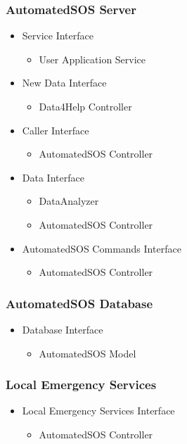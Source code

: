 \documentclass[../../DD.tex]{subfiles}
\begin{document}
		\subsubsection{AutomatedSOS Server}
		\begin{itemize}
			\item Service Interface
			\begin{itemize}
				\item User Application Service 
			\end{itemize}
			\item New Data Interface
			\begin{itemize}
				\item Data4Help Controller
			\end{itemize}
			\item Caller Interface
			\begin{itemize}
				\item AutomatedSOS Controller
			\end{itemize}
			\item Data Interface
			\begin{itemize}
				\item DataAnalyzer
				\item AutomatedSOS Controller
			\end{itemize}
			\item AutomatedSOS Commands Interface
			\begin{itemize}
				\item AutomatedSOS Controller
			\end{itemize}
		\end{itemize}

		\subsubsection{AutomatedSOS Database}
		\begin{itemize}
			\item Database Interface
			\begin{itemize}
				\item AutomatedSOS Model
			\end{itemize}
		\end{itemize}

		\subsubsection{Local Emergency Services}
		\begin{itemize}
			\item Local Emergency Services Interface
			\begin{itemize}
				\item AutomatedSOS Controller
			\end{itemize}
		\end{itemize}
		
\end{document}
